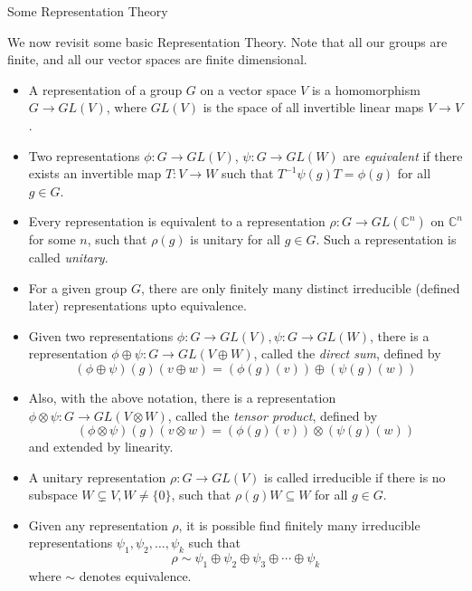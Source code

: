 \documentclass[aspectratio=169]{beamer}
\newcommand{\act}[1]{%
    \begin{frame}
    \centering
    \Huge

    {\color{purple} #1}
    \end{frame}
}
\newcommand{\C}{\mathbb{C}}
\begin{document}
\act{Some Representation Theory}

\begin{frame}
    We now revisit some basic Representation Theory. Note that all our groups are finite, and all our vector spaces are finite dimensional. 
    \begin{itemize}
        \item<2-> A representation of a group $G$ on a vector space $V$ is a homomorphism $G \to GL(V)$, where $GL(V)$ is the space of all invertible linear maps $V \to V$. 
        \item<3-> Two representations $\phi : G \to GL(V)$, $\psi : G \to GL(W)$ are \emph{equivalent} if there exists an invertible map $T : V \to W$ such that $T^{-1}\psi(g)T = \phi(g)$ for all $g \in G$.
        \item<4-> Every representation is equivalent to a representation $\rho : G \to GL(\C^n)$ on $\C^n$ for some $n$, such that $\rho(g)$ is unitary for all $g \in G$. Such a representation is called \emph{unitary}.
        \item<5-> For a given group $G$, there are only finitely many distinct irreducible (defined later) representations upto equivalence. 
    \end{itemize}
\end{frame}

\begin{frame}
    \begin{itemize}
        \item<1-> Given two representations $\phi : G \to GL(V), \psi : G \to GL(W)$, there is a representation $\phi \oplus \psi : G \to GL(V \oplus W)$, called the \emph{direct sum}, defined by \[(\phi \oplus \psi)(g)(v \oplus w) = (\phi(g)(v)) \oplus (\psi(g)(w))\]
        \item<2-> Also, with the above notation, there is a representation $\phi \otimes \psi : G \to GL(V \otimes W)$, called the \emph{tensor product}, defined by \[(\phi \otimes \psi)(g)(v \otimes w) = (\phi(g)(v)) \otimes (\psi(g)(w))\] and extended by linearity.
    \end{itemize}
\end{frame}

\begin{frame}
    \begin{itemize}
            \item<1-> A unitary representation $\rho : G \to GL(V)$ is called irreducible if there is no subspace $W \subsetneq V, W \neq \{0\}$, such that $\rho(g)W \subseteq W$ for all $g \in G$.
            \item<2-> Given any representation $\rho$, it is possible find finitely many irreducible representations $\psi_1, \psi_2, \ldots, \psi_k$ such that \[ \rho \sim \psi_1 \oplus \psi_2 \oplus \psi_3 \oplus \cdots \oplus \psi_k\]
    where $\sim$ denotes equivalence.
    \end{itemize}
\end{frame}
\end{document}
